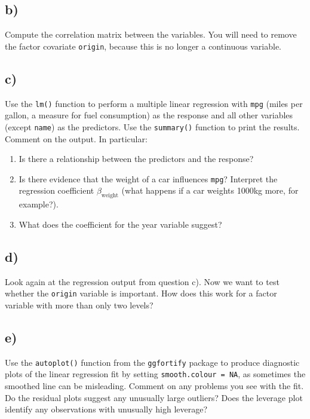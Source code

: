 \documentclass[
]{article}
\begin{document}
\hypertarget{b}{%
\subsection{b)}\label{b}}

Compute the correlation matrix between the variables. You will need to
remove the factor covariate \texttt{origin}, because this is no longer a
continuous variable.

\hypertarget{c}{%
\subsection{c)}\label{c}}

Use the \texttt{lm()} function to perform a multiple linear regression
with \texttt{mpg} (miles per gallon, a measure for fuel consumption) as
the response and all other variables (except \texttt{name}) as the
predictors. Use the \texttt{summary()} function to print the results.
Comment on the output. In particular:

\begin{enumerate}
\def\labelenumi{\roman{enumi}.}
\item
  Is there a relationship between the predictors and the response?
\item
  Is there evidence that the weight of a car influences \texttt{mpg}?
  Interpret the regression coefficient \(\beta_{\text{weight}}\) (what
  happens if a car weights 1000kg more, for example?).
\item
  What does the coefficient for the year variable suggest?
\end{enumerate}

\hypertarget{d}{%
\subsection{d)}\label{d}}

Look again at the regression output from question c). Now we want to
test whether the \texttt{origin} variable is important. How does this
work for a factor variable with more than only two levels?

\hypertarget{e}{%
\subsection{e)}\label{e}}

Use the \texttt{autoplot()} function from the \texttt{ggfortify} package
to produce diagnostic plots of the linear regression fit by setting
\texttt{smooth.colour\ =\ NA}, as sometimes the smoothed line can be
misleading. Comment on any problems you see with the fit. Do the
residual plots suggest any unusually large outliers? Does the leverage
plot identify any observations with unusually high leverage?
\end{document}

